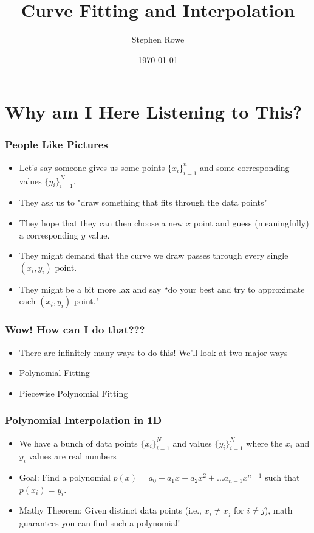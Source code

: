 \documentclass{beamer}
\title{Curve Fitting and Interpolation}
\author{Stephen Rowe}
\date{\today}
\newcommand{\STRset}[1]{\{#1\}}
\begin{document}
 

\begin{frame}

\titlepage

\end{frame}
 


\section{Why am I Here Listening to This?}
\begin{frame}
\frametitle{People Like Pictures}
\begin{itemize}
\item Let's say someone gives us some points $\{x_i\}_{i=1}^n$ and some corresponding values $\{y_i\}_{i=1}^N$.
\item They ask us to "draw something that fits through the data points" 
\item They hope that they can then choose a new $x$ point and guess (meaningfully) a corresponding $y$ value.
\item They might demand that the curve we draw passes through every single $(x_i,y_i)$ point.
\item They might be a bit more lax and say ``do your best and try to approximate each $(x_i,y_i)$ point."
\end{itemize}
\end{frame}


\begin{frame}
\frametitle{Wow! How can I do that???}
\begin{itemize}
\item There are infinitely many ways to do this! We'll look at two major ways
\item Polynomial Fitting
\item Piecewise Polynomial Fitting
\end{itemize}
\end{frame}

\begin{frame}
\frametitle{Polynomial Interpolation in 1D}
\begin{itemize}
\item We have a bunch of data points $\STRset{x_i}_{i=1}^N$ and values $\STRset{y_i}_{i=1}^N$ where the $x_i$ and $y_i$ values are real numbers
\item Goal: Find a polynomial $p(x) = a_0 + a_1 x + a_2 x^2 + ... a_{n-1}x^{n-1}$ such that $p(x_i) = y_i$.
\item Mathy Theorem: Given distinct data points (i.e., $x_i \neq x_j$ for $i \neq j$), math guarantees you can find such a polynomial!
\end{itemize}
\end{frame}
\end{document}
